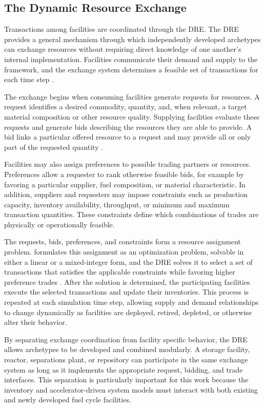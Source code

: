 \subsection{The Dynamic Resource Exchange}
\label{subsec:cyclus-dre}

Transactions among \Cyclus facilities are coordinated through the \gls{DRE}. The \gls{DRE} provides a general
mechanism through which independently developed archetypes can exchange
resources without requiring direct knowledge of one another's internal
implementation. Facilities communicate their demand and supply to the
framework, and the exchange system determines a feasible set of transactions
for each time step \cite{huff_fundamental_2016}.

The exchange begins when consuming facilities generate requests for
resources. A request identifies a desired commodity, quantity, and, when
relevant, a target material composition or other resource quality. Supplying
facilities evaluate these requests and generate bids describing the resources
they are able to provide. A bid links a particular offered resource to a
request and may provide all or only part of the requested quantity \cite{gidden_agent-based_2015}.

Facilities may also assign preferences to possible trading partners or
resources. Preferences allow a requester to rank otherwise feasible bids,
for example by favoring a particular supplier, fuel composition, or material
characteristic. In addition, suppliers and requesters may impose constraints
such as production capacity, inventory availability, throughput, or minimum
and maximum transaction quantities. These constraints define which
combinations of trades are physically or operationally feasible.

The requests, bids, preferences, and constraints form a resource assignment
problem. \Cyclus formulates this assignment as an optimization problem, solvable in
either a linear or a mixed-integer form, and the \gls{DRE} solves it to select a
set of transactions that satisfies the applicable constraints while favoring
higher preference trades \cite{gidden_agent-based_2015}.
After the solution is determined, the participating facilities execute the
selected transactions and update their inventories. This process is repeated
at each simulation time step, allowing supply and demand relationships to
change dynamically as facilities are deployed, retired, depleted, or otherwise
alter their behavior.

By separating exchange coordination from facility specific behavior, the \gls{DRE}
allows archetypes to be developed and combined modularly. A storage facility,
reactor, separations plant, or repository can participate in the same exchange
system as long as it implements the appropriate request, bidding, and trade
interfaces. This separation is particularly important for this work because
the inventory and accelerator-driven system models must interact with both
existing and newly developed fuel cycle facilities.

